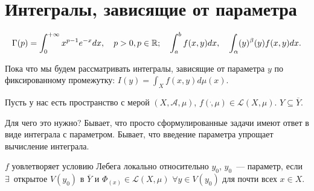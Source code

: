\section{Интегралы, зависящие от параметра}
\begin{example}
    \[\Gamma(p) = \int_0^{+\infty} x^{p-1} e ^{-x} dx, ~~~
    p > 0, p \in \mathbb{R};~~~
    \int_a^b f(x, y) dx,~~~
    \int_\alpha(y)^\beta(y) f(x, y) dx. \]
\end{example}

Пока что мы будем рассматривать интегралы, зависящие от параметра $y$ 
по фиксированному промежутку: $I(y) = \int_X f(x, y) d\mu (x)$.

Пусть у нас есть пространство с мерой $(X, \mathscr{A}, \mu)$, $f(\dot, \mu) \in \mathcal{L}(X, \mu)$.
$Y \subseteq \overline{Y}$.

Для чего это нужно? Бывает, что просто сформулированные задачи имеют ответ в виде интеграла с параметром. 
Бывает, что введение параметра упрощает вычисление интеграла.

\begin{statement}
    $f$ уовлетворяет условию Лебега локально относительно $y_0$, $y_0$~--- параметр,
    если $\exists \,$ открытое $V(y_0)$ в $\overline{Y}$ и $\Phi_{(x)} \in \mathcal{L}(X, \mu)$
    $\forall y \in V(y_0)$ для почти всех $x \in X$. 
\end{statement}

